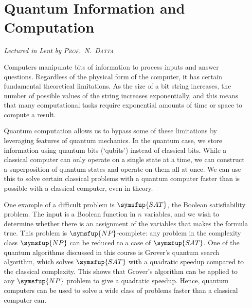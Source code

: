 \chapter[Quantum Information and Computation \\ \textnormal{\emph{Lectured in Lent \oldstylenums{2023} by \textsc{Prof.\ N.\ Datta}}}]{Quantum Information and Computation}
\emph{\Large Lectured in Lent  by \textsc{Prof.\ N.\ Datta}}

Computers manipulate bits of information to process inputs and answer questions.
Regardless of the physical form of the computer, it has certain fundamental theoretical limitations.
As the size of a bit string increases, the number of possible values of the string increases exponentially, and this means that many computational tasks require exponential amounts of time or space to compute a result.

Quantum computation allows us to bypass some of these limitations by leveraging features of quantum mechanics.
In the quantum case, we store information using quantum bits (`qubits') instead of classical bits.
While a classical computer can only operate on a single state at a time, we can construct a superposition of quantum states and operate on them all at once.
We can use this to solve certain classical problems with a quantum computer faster than is possible with a classical computer, even in theory.

One example of a difficult problem is \( \symsfup{SAT} \), the Boolean satisfiability problem.
The input is a Boolean function in \( n \) variables, and we wish to determine whether there is an assignment of the variables that makes the formula true.
This problem is \( \symsfup{NP} \)-complete: any problem in the complexity class \( \symsfup{NP} \) can be reduced to a case of \( \symsfup{SAT} \).
One of the quantum algorithms discussed in this course is Grover's quantum search algorithm, which solves \( \symsfup{SAT} \) with a quadratic speedup compared to the classical complexity.
This shows that Grover's algorithm can be applied to any \( \symsfup{NP} \) problem to give a quadratic speedup.
Hence, quantum computers can be used to solve a wide class of problems faster than a classical computer can.


